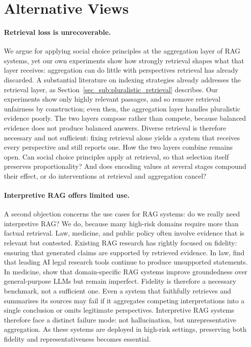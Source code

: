 \section{Alternative Views}
\label{sec:alternative_views}

\paragraph{Retrieval loss is unrecoverable.} We argue for applying social choice principles at the aggregation layer of RAG systems, yet our own experiments show how strongly retrieval shapes what that layer receives: aggregation can do little with perspectives retrieval has already discarded. A substantial literature on indexing strategies already addresses the retrieval layer, as Section~\ref{sec_sub:pluralistic_retrieval} describes. Our experiments show only highly relevant passages, and so remove retrieval unfairness by construction; even then, the aggregation layer handles pluralistic evidence poorly. The two layers compose rather than compete, because balanced evidence does not produce balanced answers. Diverse retrieval is therefore necessary and not sufficient: fixing retrieval alone yields a system that receives every perspective and still reports one. How the two layers combine remains open. Can social choice principles apply at retrieval, so that selection itself preserves proportionality? And does encoding values at several stages compound their effect, or do interventions at retrieval and aggregation cancel?

\paragraph{Interpretive RAG offers limited use.} A second objection concerns the use cases for RAG systems: do we really need interpretive RAG? We do, because many high-risk domains require more than factual retrieval. Law, medicine, and public policy often involve evidence that is relevant but contested. Existing RAG research has rightly focused on fidelity: ensuring that generated claims are supported by retrieved evidence. In law, \citet{mmagesh2025hallucinationfree} find that leading AI legal research tools continue to produce unsupported statements. In medicine, \citet{nishisako2025reducing} show that domain-specific RAG systems improve groundedness over general-purpose LLMs but remain imperfect. Fidelity is therefore a necessary benchmark, not a sufficient one. Even a system that faithfully retrieves and summarises its sources may fail if it aggregates competing interpretations into a single conclusion or omits legitimate perspectives. Interpretive RAG systems therefore face a distinct failure mode: not hallucination, but unrepresentative aggregation. As these systems are deployed in high-risk settings, preserving both fidelity and representativeness becomes essential.

